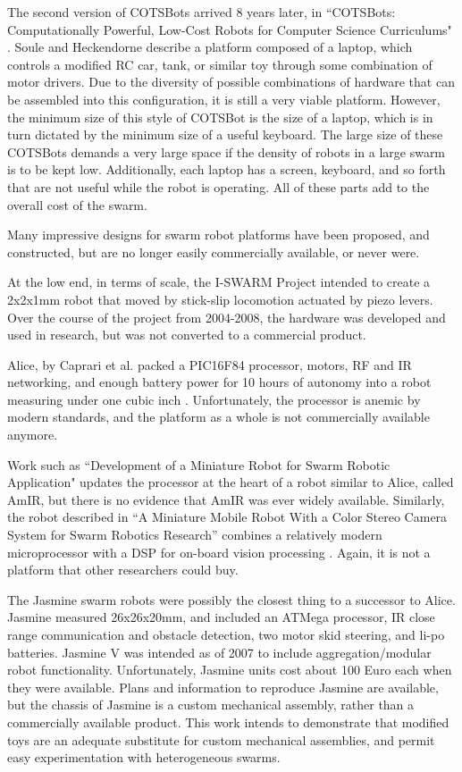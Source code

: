 \documentclass[]{article}
\begin{document}
The second version of COTSBots arrived 8 years later, in ``COTSBots: Computationally Powerful, Low-Cost Robots for Computer Science Curriculums" \cite{soule2011cotsbots}. Soule and Heckendorne describe a platform composed of a laptop, which controls a modified RC car, tank, or similar toy through some combination of motor drivers. 
Due to the diversity of possible combinations of hardware that can be assembled into this configuration, it is still a very viable platform. 
However, the minimum size of this style of COTSBot is the size of a laptop, which is in turn dictated by the minimum size of a useful keyboard. 
The large size of these COTSBots demands a very large space if the density of robots in a large swarm is to be kept low. 
Additionally, each laptop has a screen, keyboard, and so forth that are not useful while the robot is operating. 
All of these parts add to the overall cost of the swarm. 

Many impressive designs for swarm robot platforms have been proposed, and constructed, but are no longer easily commercially available, or never were. 

At the low end, in terms of scale, the I-SWARM Project intended to create a 2x2x1mm robot that moved by stick-slip locomotion actuated by piezo levers\cite{seyfried2005swarm}. Over the course of the project from 2004-2008, the hardware was developed and used in research, but was not converted to a commercial product. 

Alice, by Caprari et al. packed a PIC16F84 processor, motors, RF and IR networking, and enough battery power for 10 hours of autonomy into a robot measuring under one cubic inch \cite{caprari1998autonomous}. Unfortunately, the processor is anemic by modern standards, and the platform as a whole is not commercially available anymore.

Work such as ``Development of a Miniature Robot for Swarm Robotic Application" updates the processor at the heart of a robot similar to Alice, called AmIR, but there is no evidence that AmIR was ever widely available\cite{arvin2009development}.
Similarly, the robot described in ``A Miniature Mobile Robot With a Color Stereo Camera System for Swarm Robotics Research'' combines a relatively modern microprocessor with a DSP for on-board vision processing \cite{haverinen2005miniature}. 
Again, it is not a platform that other researchers could buy.

The Jasmine swarm robots were possibly the closest thing to a successor to Alice.
Jasmine measured 26x26x20mm, and included an ATMega processor, IR close range communication and obstacle detection, two motor skid steering, and li-po batteries.
Jasmine V was intended as of 2007 to include aggregation/modular robot functionality.  Unfortunately, Jasmine units cost about 100 Euro each when they were available. 
Plans and information to reproduce Jasmine are available, but the chassis of Jasmine is a custom mechanical assembly, rather than a commercially available product. 
This work intends to demonstrate that modified toys are an adequate substitute for custom mechanical assemblies, and permit easy experimentation with heterogeneous swarms. 
\end{document}
